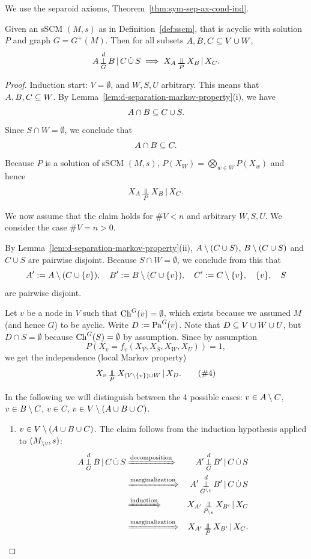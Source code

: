 We use the separoid axioms, Theorem~\ref{thm:sym-sep-ax-cond-ind}.
\begin{Thm}\label{thm:gmp_acyclic_selection_scms}
  Given an sSCM $(M,s)$ as in Definition~\ref{def:sscm}, that is acyclic with solution $P$ and graph $G = G^+(M)$.
  Then for all subsets $A,B,C \subseteq V \cup W$,
  $$A \operatorname*{\perp}_G^d B \operatorname*{|} C \,\dot{\cup}\, S \implies X_A \operatorname*{\perp\mkern-11mu\perp}_{P} X_B \operatorname*{|} X_C.$$
\end{Thm}
\begin{proof}
  Induction start: $V=\emptyset$, and $W,S,U$ arbitrary.
  This means that $A,B,C \subseteq W$.
  By Lemma~\ref{lem:d-separation-markov-property}(i), we have 
    $$A \cap B \subseteq C \cup S.$$
  Since $S \cap W = \emptyset$, we conclude that
    $$A \cap B \subseteq C.$$
  Because $P$ is a solution of sSCM $(M,s)$, $P(X_W) = \bigotimes_{w \in W} P(X_w)$ and hence
    $$X_A \operatorname*{\perp\mkern-11mu\perp}_P X_B \operatorname*{|} X_C.$$

  We now assume that the claim holds for $\#V < n$ and arbitrary $W,S,U$.
  We consider the case $\#V=n>0$.

  By Lemma~\ref{lem:d-separation-markov-property}(ii), $A\setminus (C \cup S)$, $B \setminus (C \cup S)$ and $C \cup S$ are pairwise disjoint.
  Because $S \cap W = \emptyset$, we conclude from this that
    $$A' := A \setminus (C \cup \{v\}), \quad B' := B \setminus (C \cup \{v\}), \quad C' := C \setminus \{v\}, \quad \{v\}, \quad S$$
  are pairwise disjoint.

  Let $v$ be a node in $V$ such that $\mathrm{Ch}^G(v) = \emptyset$, which exists because we assumed $M$ (and hence $G$) to be ayclic.
  Write $D := \mathrm{Pa}^G(v)$.
  Note that $D \subseteq V \cup W \cup U$, but $D \cap S = \emptyset$ because $\mathrm{Ch}^G(S) = \emptyset$ by assumption.
  Since by assumption
  $$P(X_v = f_v(X_V,X_S,X_W,X_U)) = 1,$$
  we get the independence (local Markov property)
  \begin{equation}\label{eqn:blu}
    X_v \operatorname*{\perp\mkern-11mu\perp}_P X_{(V \setminus \{v\}) \cup W} \operatorname*{|} X_D.\tag{\#4}
  \end{equation}

  In the following we will distinguish between the 4 possible cases: 
  $v \in A \setminus C$, $v \in B \setminus C$, $v \in C$, $v \in V \setminus (A \cup B \cup C)$.

  \begin{enumerate}[label=(\roman*)]
    \item $v \in V \setminus (A \cup B \cup C)$. The claim follows from the induction hypothesis applied to $(M_{\setminus v},s)$:
    \begin{align*}
      A \Perp^d_G B \given C \dcup S
      & \xRightarrow{\text{decomposition}}  & A' \Perp^d_G B' \given C \dcup S \\
      & \xRightarrow{\text{marginalization}} &  A' \Perp^d_{G^{\sm v}}  B' \given C \dcup S\\
      & \xRightarrow{\text{induction}} & X_{A'} \Indep_{P_{\sm v}} X_{B'} \given X_C\\
      & \xRightarrow{\text{marginalization}} & X_{A'} \Indep_{P} X_{B'} \given X_C.
    \end{align*}


\end{enumerate}
\end{proof}
